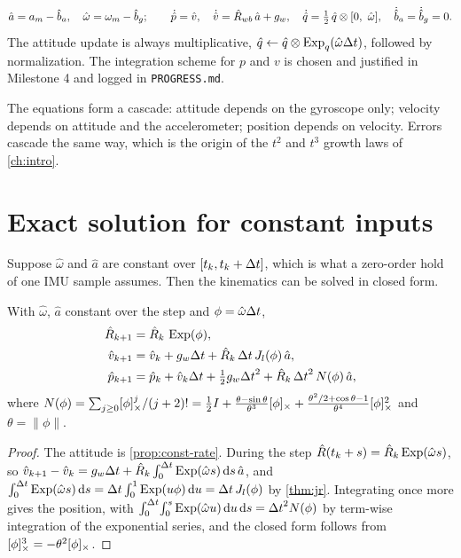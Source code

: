 \begin{convention}
\begin{equation}
  \hat a = a_m - \hat b_a,\quad \hat\omega = \omega_m - \hat b_g;\qquad
  \dot{\hat p} = \hat v,\quad \dot{\hat v} = \hat R_{wb}\,\hat a + g_w,\quad
  \dot{\hat q} = \tfrac12\,\hat q\otimes[0,\ \hat\omega],\quad \dot{\hat b}_a = \dot{\hat b}_g = 0 .
  \label{eq:nominal-ct}
\end{equation}
The attitude update is always multiplicative, $\hat q \gets \hat q\otimes\operatorname{Exp}_q(\hat\omega{\Delta t})$, followed by
normalization. The integration scheme for $p$ and $v$ is chosen and justified in Milestone 4 and logged
in \texttt{PROGRESS.md}.
\end{convention}

The equations form a cascade: attitude depends on the gyroscope only; velocity depends on attitude and the
accelerometer; position depends on velocity. Errors cascade the same way, which is the origin of the
$t^2$ and $t^3$ growth laws of \cref{ch:intro}.

\section{Exact solution for constant inputs}

Suppose $\hat\omega$ and $\hat a$ are constant over $[t_k, t_k + {\Delta t}]$, which is what a zero-order hold of one
IMU sample assumes. Then the kinematics can be solved in closed form.

\begin{proposition}
\label{prop:exact-prop}
With $\hat\omega$, $\hat a$ constant over the step and $\phi = \hat\omega{\Delta t}$,
\begin{align}
  \hat R_{k+1} &= \hat R_k\,\operatorname{Exp}(\phi), \\
  \hat v_{k+1} &= \hat v_k + g_w{\Delta t} + \hat R_k\,{\Delta t}\,J_l(\phi)\,\hat a, \\
  \hat p_{k+1} &= \hat p_k + \hat v_k{\Delta t} + \tfrac12 g_w{\Delta t}^2 + \hat R_k\,{\Delta t}^2\,N(\phi)\,\hat a,
\end{align}
where $N(\phi) = \sum_{j\ge0}[\phi]_{\times}^j/(j+2)! = \tfrac12 I + \frac{\theta - \sin\theta}{\theta^3}[\phi]_{\times} +
\frac{\theta^2/2 + \cos\theta - 1}{\theta^4}[\phi]_{\times}^2$ and $\theta = \|\phi\|$.
\end{proposition}
\begin{proof}
The attitude is \cref{prop:const-rate}. During the step $\hat R(t_k + s) = \hat R_k\operatorname{Exp}(\hat\omega s)$, so
$\hat v_{k+1} - \hat v_k = g_w{\Delta t} + \hat R_k\int_0^{\Delta t}\operatorname{Exp}(\hat\omega s)\,\mathrm{d} s\,\hat a$, and
$\int_0^{\Delta t}\operatorname{Exp}(\hat\omega s)\,\mathrm{d} s = {\Delta t}\int_0^1\operatorname{Exp}(u\phi)\,\mathrm{d} u = {\Delta t}\,J_l(\phi)$ by \cref{thm:jr}. Integrating once more
gives the position, with $\int_0^{\Delta t}\!\int_0^s\operatorname{Exp}(\hat\omega u)\,\mathrm{d} u\,\mathrm{d} s = {\Delta t}^2N(\phi)$ by term-wise integration of
the exponential series, and the closed form follows from $[\phi]_{\times}^3 = -\theta^2[\phi]_{\times}$.
\end{proof}

